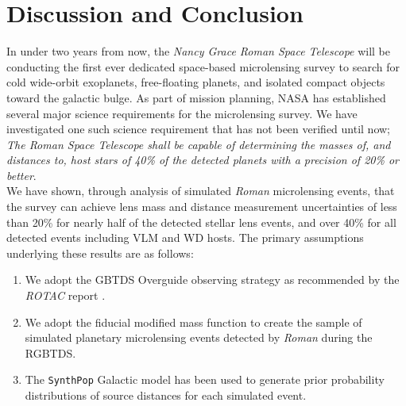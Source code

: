 \documentclass[twocolumn]{aastex631}
\begin{document}

\section{Discussion and Conclusion} \label{sec:conclusion}
In under two years from now, the \textit{Nancy Grace Roman Space Telescope} will be conducting the first ever dedicated space-based microlensing survey to search for cold wide-orbit exoplanets, free-floating planets, and isolated compact objects toward the galactic bulge. As part of mission planning, NASA has established several major science requirements for the microlensing survey. We have investigated one such science requirement that has not been verified until now; \textit{The Roman Space Telescope shall be capable of determining the masses of, and distances to, host stars of 40\% of the detected planets with a precision of 20\% or better}.\\
\indent We have shown, through analysis of simulated \textit{Roman} microlensing events, that the survey can achieve lens mass and distance measurement uncertainties of less than 20\% for nearly half of the detected stellar lens events, and over 40\% for all detected events including VLM and WD hosts. The primary assumptions underlying these results are as follows:

\begin{enumerate}
    \item We adopt the GBTDS Overguide observing strategy as recommended by the \textit{ROTAC} report \citep{rotac:2025a}.
    \item We adopt the fiducial modified \cite{cassan:2012a} mass function to create the sample of simulated planetary microlensing events detected by \textit{Roman} during the RGBTDS.
    \item The \texttt{SynthPop} Galactic model has been used to generate prior probability distributions of source distances for each simulated event.
\end{enumerate}
\end{document}
